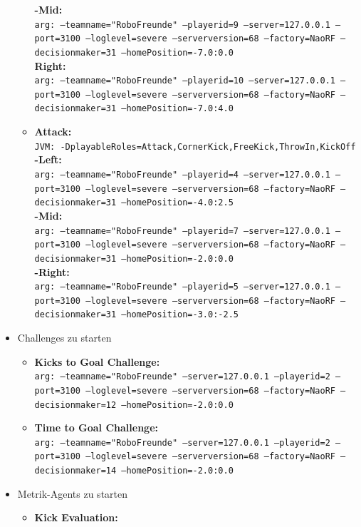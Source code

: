 \documentclass[fontsize=12pt,a4paper,final]{scrartcl}[2003/01/01]
\begin{document}
\begin{itemize}
\begin{itemize}
\textbf{-Mid:}\\
\texttt{arg: --teamname="RoboFreunde" --playerid=9 --server=127.0.0.1 --port=3100 --loglevel=severe --serverversion=68 --factory=NaoRF --decisionmaker=31 --homePosition=-7.0:0.0}\\
\textbf{Right:}\\
\texttt{arg: --teamname="RoboFreunde" --playerid=10 --server=127.0.0.1 --port=3100 --loglevel=severe --serverversion=68 --factory=NaoRF --decisionmaker=31 --homePosition=-7.0:4.0}
	\item \textbf{Attack:}\\
\texttt{JVM: -DplayableRoles=Attack,CornerKick,FreeKick,ThrowIn,KickOff}\\
\textbf{-Left:}\\
\texttt{arg: --teamname="RoboFreunde" --playerid=4 --server=127.0.0.1 --port=3100 --loglevel=severe --serverversion=68 --factory=NaoRF --decisionmaker=31 --homePosition=-4.0:2.5}\\
\textbf{-Mid:}\\
\texttt{arg: --teamname="RoboFreunde" --playerid=7 --server=127.0.0.1 --port=3100 --loglevel=severe --serverversion=68 --factory=NaoRF --decisionmaker=31 --homePosition=-2.0:0.0}\\
\textbf{-Right:}\\
\texttt{arg: --teamname="RoboFreunde" --playerid=5 --server=127.0.0.1 --port=3100 --loglevel=severe --serverversion=68 --factory=NaoRF --decisionmaker=31 --homePosition=-3.0:-2.5}
	\end{itemize}
\item Challenges zu starten
	\begin{itemize}
	\item \textbf{Kicks to Goal Challenge:}\\
\texttt{arg: --teamname="RoboFreunde" --server=127.0.0.1 --playerid=2 --port=3100 --loglevel=severe --serverversion=68 --factory=NaoRF --decisionmaker=12 --homePosition=-2.0:0.0}
	\item \textbf{Time to Goal Challenge:}\\
\texttt{arg: --teamname="RoboFreunde" --server=127.0.0.1 --playerid=2 --port=3100 --loglevel=severe --serverversion=68 --factory=NaoRF --decisionmaker=14 --homePosition=-2.0:0.0}
	\end{itemize}
\item Metrik-Agents zu starten
	\begin{itemize}
	\item \textbf{Kick Evaluation:}\\

\end{itemize}
\end{itemize}
\end{document}
